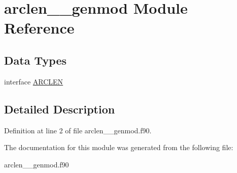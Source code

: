 \hypertarget{classarclen____genmod}{\section{arclen\+\_\+\+\_\+genmod Module Reference}
\label{classarclen____genmod}
}
\subsection*{Data Types}
\begin{DoxyCompactItemize}
\item 
interface \hyperlink{interfacearclen____genmod_1_1_a_r_c_l_e_n}{A\+R\+C\+L\+E\+N}
\end{DoxyCompactItemize}


\subsection{Detailed Description}


Definition at line 2 of file arclen\+\_\+\+\_\+genmod.\+f90.



The documentation for this module was generated from the following file\+:\begin{DoxyCompactItemize}
\item 
arclen\+\_\+\+\_\+genmod.\+f90\end{DoxyCompactItemize}
